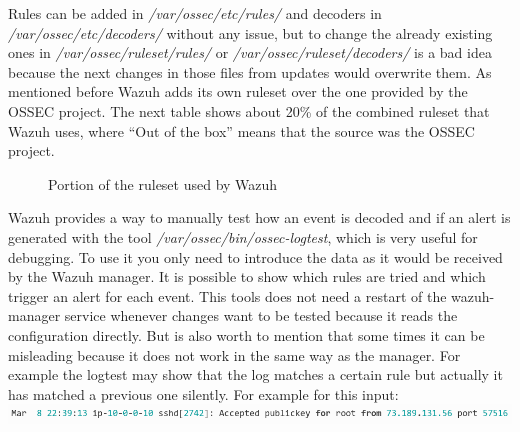 \linej
\linej
Rules can be added in \textit{/var/ossec/etc/rules/} and decoders in \textit{/var/ossec/etc/decoders/} without any issue, but to change the already existing ones in \textit{/var/ossec/ruleset/rules/} or \textit{/var/ossec/ruleset/decoders/} is a bad idea because the next changes in those files from updates would overwrite them.
\linej
\linej
As mentioned before Wazuh adds its own ruleset over the one provided by the OSSEC project. The next table shows about 20\% of the combined ruleset that Wazuh uses, where ``Out of the box'' means that the source was the OSSEC project.
\begin{figure}[H]
  \centering
	\caption{Portion of the ruleset used by Wazuh\cite{wazuh_ossec_ruleset}}
\end{figure}
\linej
Wazuh provides a way to manually test how an event is decoded and if an alert is generated with the tool \textit{/var/ossec/bin/ossec-logtest}\cite{wazuh_testing}, which is very useful for debugging.
To use it you only need to introduce the data as it would be received by the Wazuh manager.
It is possible to show which rules are tried and which trigger an alert for each event.
This tools does not need a restart of the wazuh-manager service whenever changes want to be tested because it reads the configuration directly.
\linej
But is also worth to mention that some times it can be misleading because it does not work in the same way as the manager.
For example the logtest may show that the log matches a certain rule but actually it has matched a previous one silently.
\linej
\linej
For example for this input:
\linej
\includegraphics[width=\textwidth]{figuras/ossec-logtest_input.png}
